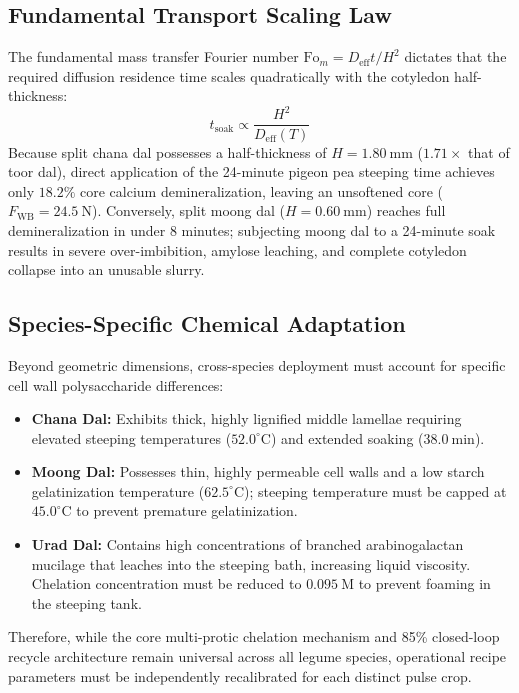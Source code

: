 \documentclass[10pt,a4paper]{article}
\begin{document}
\subsection{Fundamental Transport Scaling Law}
The fundamental mass transfer Fourier number $\mathrm{Fo}_m = D_{\mathrm{eff}} t / H^2$ dictates that the required diffusion residence time scales quadratically with the cotyledon half-thickness:
\begin{equation}
t_{\mathrm{soak}} \propto \frac{H^2}{D_{\mathrm{eff}}(T)}
\end{equation}
Because split chana dal possesses a half-thickness of $H = 1.80\ \mathrm{mm}$ ($1.71\times$ that of toor dal), direct application of the 24-minute pigeon pea steeping time achieves only $18.2\%$ core calcium demineralization, leaving an unsoftened core ($F_{\mathrm{WB}} = 24.5\ \mathrm{N}$). Conversely, split moong dal ($H = 0.60\ \mathrm{mm}$) reaches full demineralization in under 8 minutes; subjecting moong dal to a 24-minute soak results in severe over-imbibition, amylose leaching, and complete cotyledon collapse into an unusable slurry.

\subsection{Species-Specific Chemical Adaptation}
Beyond geometric dimensions, cross-species deployment must account for specific cell wall polysaccharide differences:
\begin{itemize}[leftmargin=1.5em]
    \item \textbf{Chana Dal:} Exhibits thick, highly lignified middle lamellae requiring elevated steeping temperatures ($52.0^\circ\mathrm{C}$) and extended soaking ($38.0\ \mathrm{min}$).
    \item \textbf{Moong Dal:} Possesses thin, highly permeable cell walls and a low starch gelatinization temperature ($62.5^\circ\mathrm{C}$); steeping temperature must be capped at $45.0^\circ\mathrm{C}$ to prevent premature gelatinization.
    \item \textbf{Urad Dal:} Contains high concentrations of branched arabinogalactan mucilage that leaches into the steeping bath, increasing liquid viscosity. Chelation concentration must be reduced to $0.095\ \mathrm{M}$ to prevent foaming in the steeping tank.
\end{itemize}
Therefore, while the core multi-protic chelation mechanism and 85\% closed-loop recycle architecture remain universal across all legume species, operational recipe parameters must be independently recalibrated for each distinct pulse crop.
\end{document}
